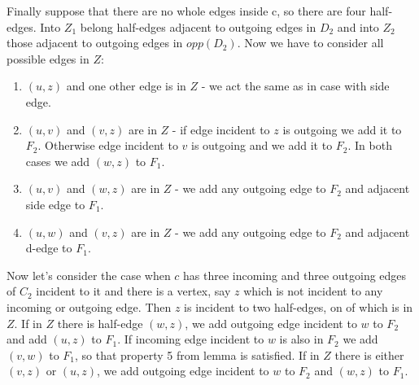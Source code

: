 \documentclass[a4, 11pt]{article}
\newcommand{\<}{\langle}
\renewcommand{\>}{\rangle}
\begin{document}
Finally suppose that there are no whole edges inside c, so there are four half-edges. Into $Z_1$ belong half-edges adjacent to outgoing edges in $D_2$ and into $Z_2$ those adjacent to outgoing edges in $opp(D_2)$. Now we have to consider all possible edges in $Z$:
\begin{enumerate}
	\item $(u,z)$ and one other edge is in $Z$ - we act the same as in case with side edge.
	\item $(u,v)$ and $(v,z)$ are in $Z$ - if edge incident to $z$ is outgoing we add it to $F_2$. Otherwise edge incident to $v$ is outgoing and we add it to $F_2$. In both cases we add $(w,z)$ to $F_1$.
	\item $(u,v)$ and $(w,z)$ are in $Z$ - we add any outgoing edge to $F_2$ and adjacent side edge to $F_1$.
	\item $(u,w)$ and $(v,z)$ are in $Z$ - we add any outgoing edge to $F_2$ and adjacent d-edge to $F_1$.
\end{enumerate}

Now let's consider the case when $c$ has three incoming and three outgoing edges of $C_2$ incident to it and there is a vertex, say $z$ which is not incident to any incoming or outgoing edge. Then $z$ is incident to two half-edges, on of which is in $Z$. If in $Z$ there is half-edge $(w,z)$, we add outgoing edge incident to $w$ to $F_2$ and add $(u,z)$ to $F_1$. If incoming edge incident to $w$ is also in $F_2$ we add $(v,w)$ to $F_1$, so that property 5 from lemma is satisfied. If in $Z$ there is either $(v,z)$ or $(u,z)$, we add outgoing edge incident to $w$ to $F_2$ and $(w,z)$ to $F_1$.
\end{document}
